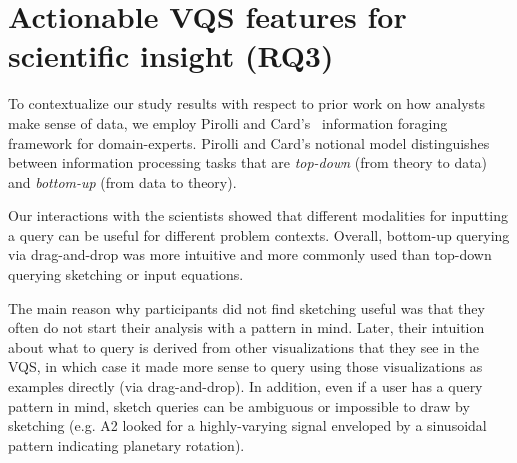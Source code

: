 \section{Actionable VQS features for scientific insight (RQ3)} \label{VQS_features_discussion}
To contextualize our study results with respect to prior work on how analysts make sense of data, we employ Pirolli and Card's~\cite{Pirolli} information foraging framework for domain-experts. Pirolli and Card's notional model distinguishes between information processing tasks that are \textit{top-down} (from theory to data) and \textit{bottom-up} (from data to theory).  
\par Our interactions with the scientists showed that different modalities for inputting a query can be useful for different problem contexts.  Overall,  bottom-up querying via drag-and-drop was more intuitive and more commonly used than top-down querying  sketching or input equations. 
\par The main reason why participants did not find sketching useful was that they often do not start their analysis with a pattern in mind. Later, their intuition about what to query is derived from other visualizations that they see in the VQS, in which case it made more sense to query using those visualizations as examples directly (via drag-and-drop). In addition, even if a user has a query pattern in mind, sketch queries can be ambiguous \cite{correll2016semantics} or impossible to draw by sketching (e.g. A2 looked for a highly-varying signal enveloped by a sinusoidal pattern indicating planetary rotation). 
